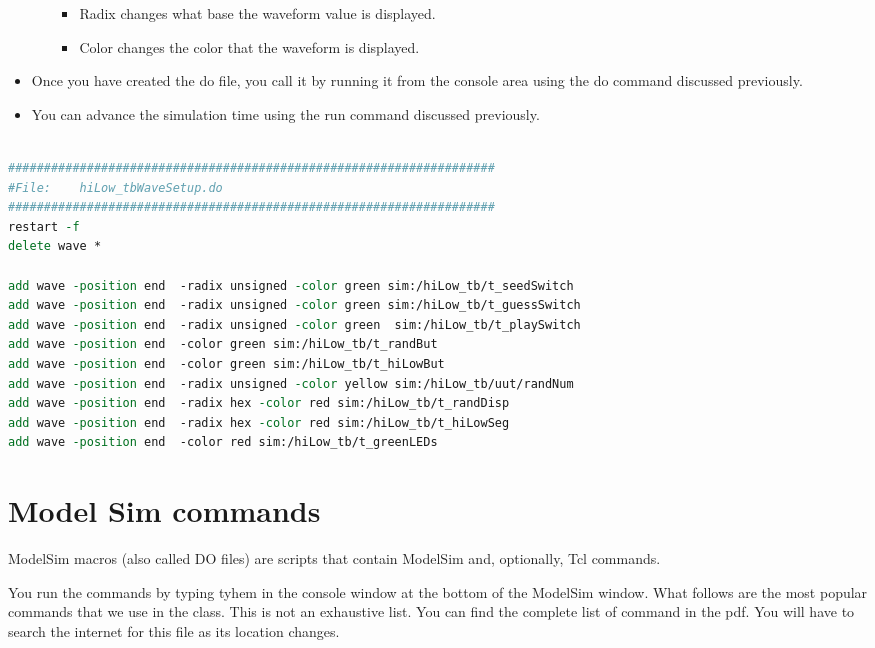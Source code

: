 \begin{itemize}
\begin{itemize}
                \begin{itemize}
                    \item
                        Radix changes what base the waveform value is displayed.
                    \item
                        Color changes the color that the waveform is displayed.
                \end{itemize}
        \end{itemize}
    \item
        Once you have created the do file, you call it by running it from the
        console area using the do command discussed previously.
    \item
        You can advance the simulation time using the run command discussed
        previously.
\end{itemize}

\begin{lstlisting}[language=tcl,
caption={do file for  hiLow\_tb.},
label={listing:howToDoFile},
basicstyle=\tiny,
frame=single]

####################################################################
#File:    hiLow_tbWaveSetup.do
####################################################################
restart -f
delete wave *

add wave -position end  -radix unsigned -color green sim:/hiLow_tb/t_seedSwitch
add wave -position end  -radix unsigned -color green sim:/hiLow_tb/t_guessSwitch
add wave -position end  -radix unsigned -color green  sim:/hiLow_tb/t_playSwitch
add wave -position end  -color green sim:/hiLow_tb/t_randBut
add wave -position end  -color green sim:/hiLow_tb/t_hiLowBut
add wave -position end  -radix unsigned -color yellow sim:/hiLow_tb/uut/randNum
add wave -position end  -radix hex -color red sim:/hiLow_tb/t_randDisp
add wave -position end  -radix hex -color red sim:/hiLow_tb/t_hiLowSeg
add wave -position end  -color red sim:/hiLow_tb/t_greenLEDs

    \end{lstlisting}

\section{Model Sim commands}
ModelSim macros (also called DO files) are scripts that contain ModelSim and, optionally, Tcl commands.

You run the commands by typing tyhem in the console window at the bottom of the ModelSim window.
What follows are the most popular commands that we use in the class.  This is not an exhaustive list.
You can find the complete list of command in the
 pdf.  You will have to search
the internet for this file as its location changes.

